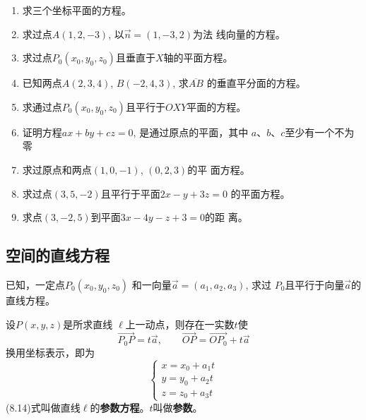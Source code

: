 \begin{ex}
\begin{enumerate}
    \item  求三个坐标平面的方程。
    \item  求过点$A(1,2,-3)$, 以$\vec{n}=(1,-3,2)$为法
    线向量的方程。
    \item  求过点$P_0(x_0,y_0,z_0)$且垂直于$X$轴的平面方程。
    \item  已知两点$A(2,3,4)$, $B(-2,4,3)$, 求$\overline{AB}$
    的垂直平分面的方程。
    \item  求通过点$P_0(x_0,y_0,z_0)$且平行于$OXY$平面的方程。
    \item  证明方程$ax+by+cz=0$, 是通过原点的平面，其中
    $a$、$b$、$c$至少有一个不为零
    \item  求过原点和两点$(1,0,-1)$, $(0,2,3)$的平
    面方程。
    \item  求过点$(3,5,-2)$且平行于平面$2x-y+3z=0$
    的平面方程。
    \item  求点$(3,-2,5)$到平面$3x-4y-z+3=0$的距
    离。
\end{enumerate}
\end{ex}


\subsection{空间的直线方程}
已知，一定点$P_0(x_0,y_0,z_0)$
和一向量$\vec{a}=(a_1,a_2,a_3)$, 求过
$P_0$且平行于向量$\vec{a}$的直线方程。

\begin{figure}[htp]
    \centering
{}
    \caption{}
\end{figure}

设$P(x,y,z)$是所求直线
$\ell$上一动点，则存在一实数$t$使
\[\Vec{P_0P}=t\vec{a},\qquad \Vec{OP}=\Vec{OP_0}+t\vec{a}\]
换用坐标表示，即为
\begin{equation}
    \begin{cases}
        x=x_0+a_1t\\
y = y_0+a_2t\\
z=z_0+a_3t
    \end{cases}
\end{equation}
(8.14)式叫做直线$\ell$的\textbf{参数方程}。$t$叫做\textbf{参数}。

